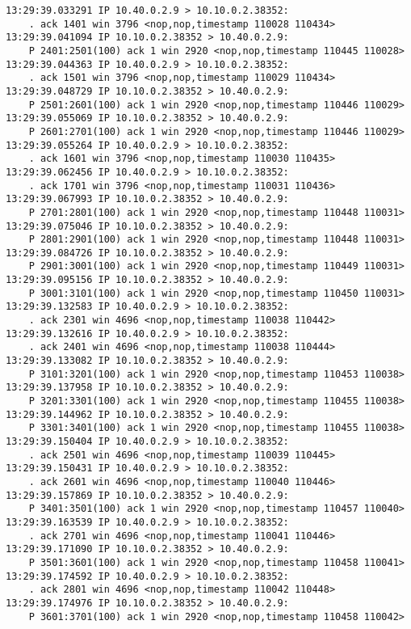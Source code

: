 \documentclass[a4paper,12pt]{article}
\begin{document}
\begin{Verbatim}
13:29:39.033291 IP 10.40.0.2.9 > 10.10.0.2.38352: 
    . ack 1401 win 3796 <nop,nop,timestamp 110028 110434>
13:29:39.041094 IP 10.10.0.2.38352 > 10.40.0.2.9: 
    P 2401:2501(100) ack 1 win 2920 <nop,nop,timestamp 110445 110028>
13:29:39.044363 IP 10.40.0.2.9 > 10.10.0.2.38352: 
    . ack 1501 win 3796 <nop,nop,timestamp 110029 110434>
13:29:39.048729 IP 10.10.0.2.38352 > 10.40.0.2.9: 
    P 2501:2601(100) ack 1 win 2920 <nop,nop,timestamp 110446 110029>
13:29:39.055069 IP 10.10.0.2.38352 > 10.40.0.2.9: 
    P 2601:2701(100) ack 1 win 2920 <nop,nop,timestamp 110446 110029>
13:29:39.055264 IP 10.40.0.2.9 > 10.10.0.2.38352: 
    . ack 1601 win 3796 <nop,nop,timestamp 110030 110435>
13:29:39.062456 IP 10.40.0.2.9 > 10.10.0.2.38352: 
    . ack 1701 win 3796 <nop,nop,timestamp 110031 110436>
13:29:39.067993 IP 10.10.0.2.38352 > 10.40.0.2.9: 
    P 2701:2801(100) ack 1 win 2920 <nop,nop,timestamp 110448 110031>
13:29:39.075046 IP 10.10.0.2.38352 > 10.40.0.2.9: 
    P 2801:2901(100) ack 1 win 2920 <nop,nop,timestamp 110448 110031>
13:29:39.084726 IP 10.10.0.2.38352 > 10.40.0.2.9: 
    P 2901:3001(100) ack 1 win 2920 <nop,nop,timestamp 110449 110031>
13:29:39.095156 IP 10.10.0.2.38352 > 10.40.0.2.9: 
    P 3001:3101(100) ack 1 win 2920 <nop,nop,timestamp 110450 110031>
13:29:39.132583 IP 10.40.0.2.9 > 10.10.0.2.38352: 
    . ack 2301 win 4696 <nop,nop,timestamp 110038 110442>
13:29:39.132616 IP 10.40.0.2.9 > 10.10.0.2.38352: 
    . ack 2401 win 4696 <nop,nop,timestamp 110038 110444>
13:29:39.133082 IP 10.10.0.2.38352 > 10.40.0.2.9: 
    P 3101:3201(100) ack 1 win 2920 <nop,nop,timestamp 110453 110038>
13:29:39.137958 IP 10.10.0.2.38352 > 10.40.0.2.9: 
    P 3201:3301(100) ack 1 win 2920 <nop,nop,timestamp 110455 110038>
13:29:39.144962 IP 10.10.0.2.38352 > 10.40.0.2.9: 
    P 3301:3401(100) ack 1 win 2920 <nop,nop,timestamp 110455 110038>
13:29:39.150404 IP 10.40.0.2.9 > 10.10.0.2.38352: 
    . ack 2501 win 4696 <nop,nop,timestamp 110039 110445>
13:29:39.150431 IP 10.40.0.2.9 > 10.10.0.2.38352: 
    . ack 2601 win 4696 <nop,nop,timestamp 110040 110446>
13:29:39.157869 IP 10.10.0.2.38352 > 10.40.0.2.9: 
    P 3401:3501(100) ack 1 win 2920 <nop,nop,timestamp 110457 110040>
13:29:39.163539 IP 10.40.0.2.9 > 10.10.0.2.38352: 
    . ack 2701 win 4696 <nop,nop,timestamp 110041 110446>
13:29:39.171090 IP 10.10.0.2.38352 > 10.40.0.2.9: 
    P 3501:3601(100) ack 1 win 2920 <nop,nop,timestamp 110458 110041>
13:29:39.174592 IP 10.40.0.2.9 > 10.10.0.2.38352: 
    . ack 2801 win 4696 <nop,nop,timestamp 110042 110448>
13:29:39.174976 IP 10.10.0.2.38352 > 10.40.0.2.9: 
    P 3601:3701(100) ack 1 win 2920 <nop,nop,timestamp 110458 110042>

\end{Verbatim}
\end{document}
